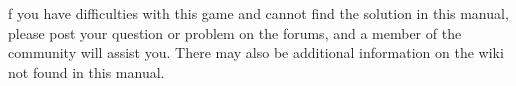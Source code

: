 \documentclass[openany]{book}
\begin{document}
f you have difficulties with this game and cannot find the solution in this manual, please post your question or problem on the forums, and a member of the community will assist you. There may also be additional information on the wiki not found in this manual.

\tableofcontents

\mainmatter























\backmatter

\cleardoublepage
{}
\printindex
\end{document}
